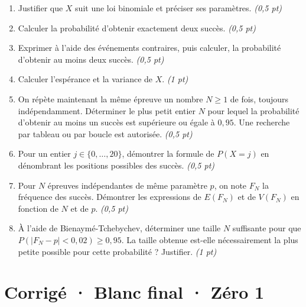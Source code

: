 \begin{enumerate}

\item Justifier que $X$ suit une loi binomiale et préciser ses paramètres. \hfill\textit{(0,5 pt)}

\item Calculer la probabilité d'obtenir exactement deux succès. \hfill\textit{(0,5 pt)}

\item Exprimer à l'aide des événements contraires, puis calculer, la probabilité d'obtenir au moins deux succès. \hfill\textit{(0,5 pt)}

\item Calculer l'espérance et la variance de $X$. \hfill\textit{(1 pt)}

\item On répète maintenant la même épreuve un nombre $N\ge1$ de fois, toujours indépendamment. Déterminer le plus petit entier $N$ pour lequel la probabilité d'obtenir au moins un succès est supérieure ou égale à $0{,}95$. Une recherche par tableau ou par boucle est autorisée. \hfill\textit{(0,5 pt)}

\item Pour un entier $j\in\{0,\ldots,20\}$, démontrer la formule de $P(X=j)$ en dénombrant les positions possibles des succès. \hfill\textit{(0,5 pt)}

\item Pour $N$ épreuves indépendantes de même paramètre $p$, on note $F_N$ la fréquence des succès. Démontrer les expressions de $E(F_N)$ et de $V(F_N)$ en fonction de $N$ et de $p$. \hfill\textit{(0,5 pt)}

\item À l'aide de Bienaymé-Tchebychev, déterminer une taille $N$ suffisante pour que $P(|F_N-p|<0{,}02)\ge0{,}95$. La taille obtenue est-elle nécessairement la plus petite possible pour cette probabilité ? Justifier. \hfill\textit{(1 pt)}

\end{enumerate}

\ifprof\clearpage

\section*{Corrigé · Blanc final · Zéro 1}\label{cor:9-1}

